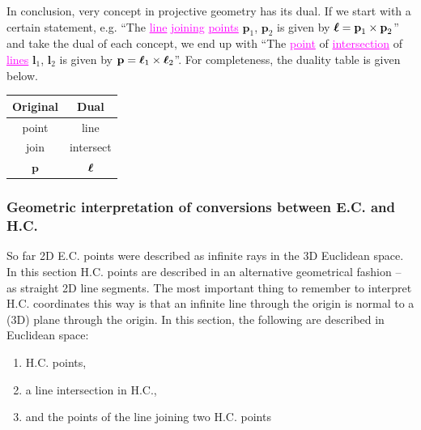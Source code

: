 \documentclass[a4paper]{article}
\begin{document}
In conclusion, very concept in projective geometry has its dual. If we start with a certain statement, e.g. ``The \textcolor{magenta}{\underline{line}} \textcolor{magenta}{\underline{joining}} \textcolor{magenta}{\underline{points}} $\textbf{p}_1$, $\textbf{p}_2$ is given by $\boldsymbol{\ell} = \textbf{p}_1\times \textbf{p}_2$''  and take the dual of each concept, we end up with ``The \textcolor{magenta}{\underline{point}} of \textcolor{magenta}{\underline{intersection}} of  \textcolor{magenta}{\underline{lines}} $\textbf{l}_1$, $\textbf{l}_2$ is given by $\textbf{p} = \boldsymbol{\ell}_1\times \boldsymbol{\ell}_2$''. For completeness, the duality table is given below.
\begin{table}[h!]
\centering
 \begin{tabular}{c c} 
 \hline
 Original & Dual\\ [0.5ex] 
 \hline
 point & line \\
 join & intersect \\
 $\textbf{p}$ & $\boldsymbol{\ell}$ \\
 [1ex] 
 \hline
 \end{tabular}
\end{table}

\subsubsection{Geometric interpretation of conversions between E.C. and H.C.} 

So far 2D E.C. points were described as infinite rays in the 3D Euclidean space. In this section H.C. points are described in an alternative geometrical fashion -- as straight 2D line segments. The most important thing to remember to interpret H.C. coordinates this way is that an infinite line through the origin is normal to a (3D) plane through the origin. In this section, the following are described in Euclidean space:
\begin{enumerate}
    \item H.C. points,
    \item a line intersection in H.C.,
    \item and the points of the line joining two H.C. points
\end{enumerate}
\end{document}

